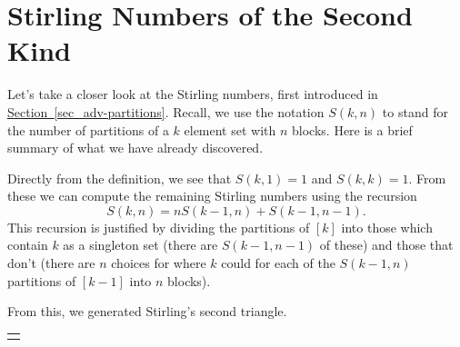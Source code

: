 \documentclass[10pt,]{book}
\theoremstyle{plain}
\theoremstyle{definition}
\theoremstyle{definition}
\theoremstyle{definition}
\numberwithin{equation}{chapter}
\newlength{\panelmax}
\begin{document}
\section[{Stirling Numbers of the Second Kind}]{Stirling Numbers of the Second Kind}\label{sec_adv-stirling}
\hypertarget{p-1391}{}%
Let's take a closer look at the Stirling numbers, first introduced in \hyperref[sec_adv-partitions]{Section~\ref{sec_adv-partitions}}.  Recall, we use the notation \(S(k,n)\) to stand for the number of partitions of a \(k\) element set with \(n\) blocks.  Here is a brief summary of what we have already discovered.%
\par
\hypertarget{p-1392}{}%
Directly from the definition, we see that \(S(k,1) = 1\) and \(S(k,k) = 1\).  From these we can compute the remaining Stirling numbers using the recursion%
\begin{equation*}
S(k,n) = nS(k-1,n) + S(k-1, n-1).
\end{equation*}
This recursion is justified by dividing the partitions of \([k]\) into those which contain \(k\) as a singleton set (there are \(S(k-1, n-1)\) of these) and those that don't (there are \(n\) choices for where \(k\) could for each of the \(S(k-1, n)\) partitions of \([k-1]\) into \(n\) blocks).%
\par
\hypertarget{p-1393}{}%
From this, we generated Stirling's second triangle.%
{%
\setlength{\panelmax}{0pt}
\ifdefined\panelboxAtabular\else\newsavebox{\panelboxAtabular}\fi%
\ifdefined\phAtabular\else\newlength{\phAtabular}\fi%
\setlength{\phAtabular}{\ht\panelboxAtabular+\dp\panelboxAtabular}
\settototalheight{\phAtabular}{\usebox{\panelboxAtabular}}
\setlength{\panelmax}{\maxof{\panelmax}{\phAtabular}}
\leavevmode%
\setlength{\tabcolsep}{0\linewidth}
\par\medskip\noindent
\hspace*{0.25\linewidth}%
\begin{tabular}{@{}*{1}{c}@{}}
\begin{minipage}[c][\panelmax][t]{0.5\linewidth}\usebox{\panelboxAtabular}\end{minipage}\end{tabular}\\
}%
\end{document}
